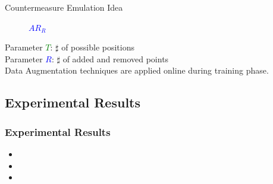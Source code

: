 \begin{frame}
\begin{block}{Countermeasure Emulation Idea}
\begin{figure}
\begin{minipage}[b]{0.5\linewidth}
    \caption{\textcolor{blue}{$AR_R$}}
  \end{minipage} 
\end{figure}
\vspace{-9pt}
Parameter  \textcolor{green}{$T$}: $\sharp$ of possible positions \hfill {}\\
Parameter \textcolor{blue}{$R$}: $\sharp$ of added and removed points \hfill {}\\
Data Augmentation techniques are applied online during training phase.
\end{block}
\end{frame}


\subsection{Experimental Results}
\begin{frame}
\frametitle{Experimental Results}
\begin{itemize}
\item {}
\item {}
\item {}
\end{itemize}
\end{frame}

